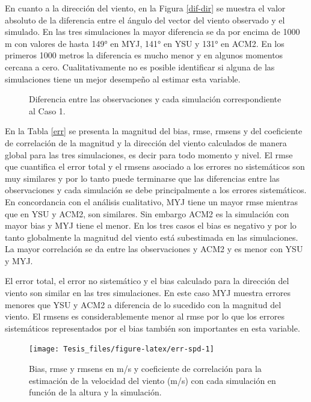 \documentclass[12pt,spanish,oneside, a4paper]{book}
\begin{document}
En cuanto a la dirección del viento, en la Figura \ref{dif-dir} se
muestra el valor absoluto de la diferencia entre el ángulo del vector
del viento observado y el simulado. En las tres simulaciones la mayor
diferencia se da por encima de 1000 m con valores de hasta 149° en MYJ,
141° en YSU y 131° en ACM2. En los primeros 1000 metros la diferencia es
mucho menor y en algunos momentos cercana a cero. Cualitativamente no es
posible identificar si alguna de las simulaciones tiene un mejor
desempeño al estimar esta variable.

\begin{figure}
\caption{Diferencia entre las observaciones y cada simulación  correspondiente al Caso 1. \label{dif}}\label{fig:diferencia}
\end{figure}

En la Tabla \ref{err} se presenta la magnitud del bias, rmse, rmsens y
del coeficiente de correlación de la magnitud y la dirección del viento
calculados de manera global para las tres simulaciones, es decir para
todo momento y nivel. El rmse que cuantifica el error total y el rmsens
asociado a los errores no sistemáticos son muy similares y por lo tanto
puede terminarse que las diferencias entre las observaciones y cada
simulación se debe principalmente a los errores sistemáticos. En
concordancia con el análisis cualitativo, MYJ tiene un mayor rmse
mientras que en YSU y ACM2, son similares. Sin embargo ACM2 es la
simulación con mayor bias y MYJ tiene el menor. En los tres casos el
bias es negativo y por lo tanto globalmente la magnitud del viento está
subestimada en las simulaciones. La mayor correlación se da entre las
observaciones y ACM2 y es menor con YSU y MYJ.

El error total, el error no sistemático y el bias calculado para la
dirección del viento son similar en las tres simulaciones. En este caso
MYJ muestra errores menores que YSU y ACM2 a diferencia de lo sucedido
con la magnitud del viento. El rmsens es considerablemente menor al rmse
por lo que los errores sistemáticos representados por el bias también
son importantes en esta variable.

\begin{figure}

{\centering \texttt{[image: Tesis\_files/figure-latex/err-spd-1]} 

}

\caption{Bias, rmse y rmsens en m/s y coeficiente de correlación para la estimación de la velocidad del viento (m/s) con cada simulación en función de la altura y la simulación. \label{err-spd}}\label{fig:err-spd}
\end{figure}
\end{document}
